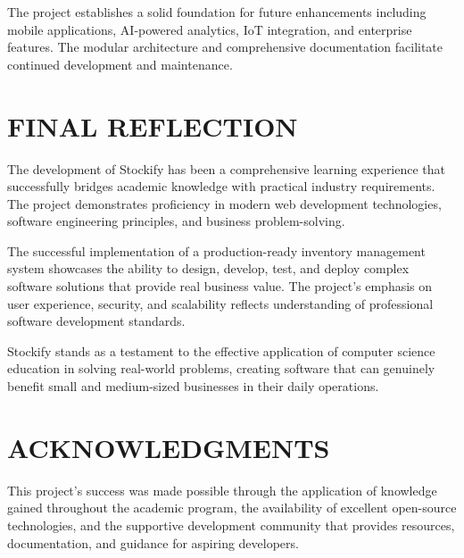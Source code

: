 The project establishes a solid foundation for future enhancements including mobile applications, AI-powered analytics, IoT integration, and enterprise features. The modular architecture and comprehensive documentation facilitate continued development and maintenance.

\section{FINAL REFLECTION}

The development of Stockify has been a comprehensive learning experience that successfully bridges academic knowledge with practical industry requirements. The project demonstrates proficiency in modern web development technologies, software engineering principles, and business problem-solving.

The successful implementation of a production-ready inventory management system showcases the ability to design, develop, test, and deploy complex software solutions that provide real business value. The project's emphasis on user experience, security, and scalability reflects understanding of professional software development standards.

Stockify stands as a testament to the effective application of computer science education in solving real-world problems, creating software that can genuinely benefit small and medium-sized businesses in their daily operations.

\section{ACKNOWLEDGMENTS}

This project's success was made possible through the application of knowledge gained throughout the academic program, the availability of excellent open-source technologies, and the supportive development community that provides resources, documentation, and guidance for aspiring developers.